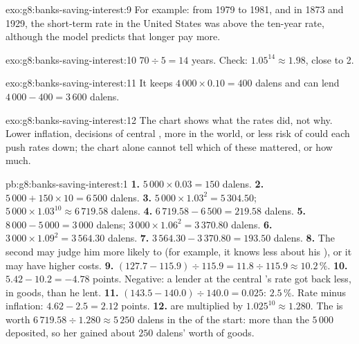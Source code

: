 \begin{solution}{exo:g8:banks-saving-interest:9}
For example: from 1979 to 1981, and in 1873 and 1929, the short-term rate in the United States was above
the ten-year rate, although the model predicts that longer  pay more.
\end{solution}

\begin{solution}{exo:g8:banks-saving-interest:10}
$70 \div 5 = 14$ years. Check: $1.05^{14} \approx 1.98$, close to 2.
\end{solution}

\begin{solution}{exo:g8:banks-saving-interest:11}
It keeps $4\,000 \times 0.10 = 400$ dalens and can lend $4\,000 - 400 = 3\,600$ dalens.
\end{solution}

\begin{solution}{exo:g8:banks-saving-interest:12}
The chart shows what the rates did, not why. Lower inflation, decisions of central , more 
in the world, or less risk of  could each push rates down; the chart alone cannot tell which of
these mattered, or how much.
\end{solution}

\begin{solution}{pb:g8:banks-saving-interest:1}
\textbf{1.} $5\,000 \times 0.03 = 150$ dalens.
\textbf{2.} $5\,000 + 150 \times 10 = 6\,500$ dalens.
\textbf{3.} $5\,000 \times 1.03^{2} = 5\,304.50$; $5\,000 \times 1.03^{10} \approx 6\,719.58$ dalens.
\textbf{4.} $6\,719.58 - 6\,500 = 219.58$ dalens.
\textbf{5.} $8\,000 - 5\,000 = 3\,000$ dalens; $3\,000 \times 1.06^{2} = 3\,370.80$ dalens.
\textbf{6.} $3\,000 \times 1.09^{2} = 3\,564.30$ dalens.
\textbf{7.} $3\,564.30 - 3\,370.80 = 193.50$ dalens.
\textbf{8.} The second  may judge him more likely to  (for example, it knows less about his
), or it may have higher costs.
\textbf{9.} $(127.7 - 115.9) \div 115.9 = 11.8 \div 115.9 \approx 10.2\,\%$.
\textbf{10.} $5.42 - 10.2 = -4.78$ points. Negative: a lender at the central 's rate got back less,
in goods, than he lent.
\textbf{11.} $(143.5 - 140.0) \div 140.0 = 0.025$: $2.5\,\%$. Rate minus inflation: $4.62 - 2.5 =
2.12$ points.
\textbf{12.}  are multiplied by $1.025^{10} \approx 1.280$. The  is worth $6\,719.58 \div
1.280 \approx 5\,250$ dalens in the  of the start: more than the $5\,000$ deposited, so her
 gained about $250$ dalens' worth of goods.
\end{solution}
